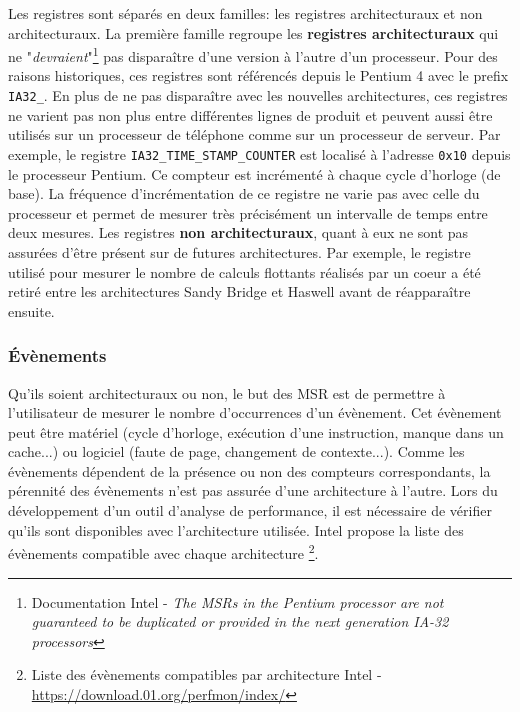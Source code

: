         Les registres sont séparés en deux familles: les registres architecturaux et non architecturaux. 
        La première famille regroupe les \textbf{registres architecturaux} qui ne "\textit{devraient}"\footnote{Documentation Intel - \textit{The MSRs in the Pentium processor are not guaranteed to be duplicated or provided in the next generation IA-32 processors}} pas disparaître d'une version à l'autre d'un processeur. Pour des raisons historiques, ces registres sont référencés depuis le Pentium 4 avec le prefix \verb|IA32_|. En plus de ne pas disparaître avec les nouvelles architectures, ces registres ne varient pas non plus entre différentes lignes de produit et peuvent aussi être utilisés sur un processeur de téléphone comme sur un processeur de serveur. Par exemple, le registre \verb|IA32_TIME_STAMP_COUNTER| est localisé à l'adresse \verb|0x10| depuis le processeur Pentium. Ce compteur est incrémenté à chaque cycle d'horloge (de base). La fréquence d'incrémentation de ce registre ne varie pas avec celle du processeur et permet de mesurer très précisément un intervalle de temps entre deux mesures. 
        Les registres \textbf{non architecturaux}, quant à eux ne sont pas assurées d'être présent sur de futures architectures. Par exemple, le registre utilisé pour mesurer le nombre de calculs flottants réalisés par un coeur a été retiré entre les architectures Sandy Bridge et Haswell avant de réapparaître ensuite. 
    
    
    \subsubsection{Évènements}
    
        Qu'ils soient architecturaux ou non, le but des MSR est de permettre à l'utilisateur de mesurer le nombre d'occurrences d'un évènement. Cet évènement peut être matériel (cycle d'horloge, exécution d'une instruction, manque dans un cache...) ou logiciel (faute de page, changement de contexte...). Comme les évènements dépendent de la présence ou non des compteurs correspondants, la pérennité des évènements n'est pas assurée d'une architecture à l'autre. Lors du développement d'un outil d'analyse de performance, il est nécessaire de vérifier qu'ils sont disponibles avec l'architecture utilisée. Intel propose la liste des évènements compatible avec chaque architecture \footnote{Liste des évènements compatibles par architecture Intel - \url{https://download.01.org/perfmon/index/}}.
            
